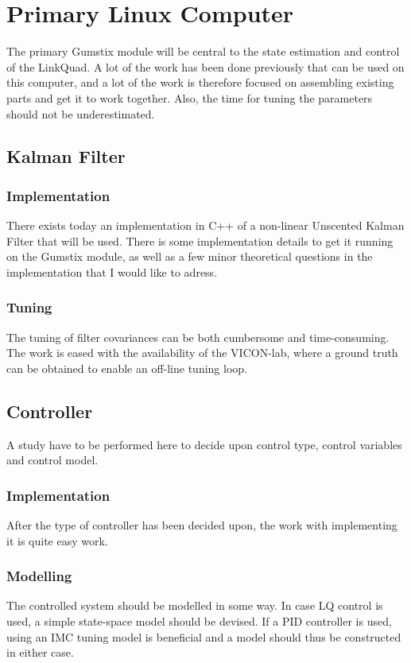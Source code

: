 \section{Primary Linux Computer}
    The primary Gumstix module will be central to the state estimation
    and control of the LinkQuad. A lot of the work has been done previously
    that can be used on this computer, and a lot of the work is therefore
    focused on assembling existing parts and get it to work together.
    Also, the time for tuning the parameters should not be underestimated.

    \subsection{Kalman Filter}
        \subsubsection{Implementation}
            There exists today an implementation in C++ of a
            non-linear Unscented Kalman Filter that will be used.
            There is some implementation details to get it running on the
            Gumstix module, as well as a few minor theoretical questions
            in the implementation that I would like to adress.

        \subsubsection{Tuning}
            The tuning of filter covariances can be both cumbersome and
            time-consuming. The work is eased with the availability of
            the VICON-lab, where a ground truth can be obtained to
            enable an off-line tuning loop.

    \subsection{Controller}
        A study have to be performed here to decide upon control type,
        control variables and control model.
        \subsubsection{Implementation}
            After the type of controller has been decided upon, the work
            with implementing it is quite easy work.

        \subsubsection{Modelling}
            The controlled system should be modelled in some way.
            In case LQ control is used, a simple state-space model should
            be devised. If a PID controller is used, using an IMC tuning model
            is beneficial and a model should thus be constructed in either case.


